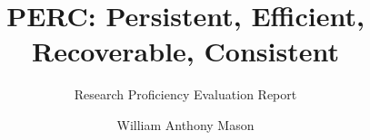 \documentclass[balanced,twoside,11pt]{ubcdiss}
\title{PERC: Persistent, Efficient, Recoverable, Consistent}
\subtitle{Research Proficiency Evaluation Report}
\author{William Anthony Mason}
\begin{document}

\maketitle




\cleardoublepage

%

%

\tableofcontents
\cleardoublepage	%





\textspacing		%

%


\mainmatter

\acresetall	%



%
%
%
%
%
\end{document}
